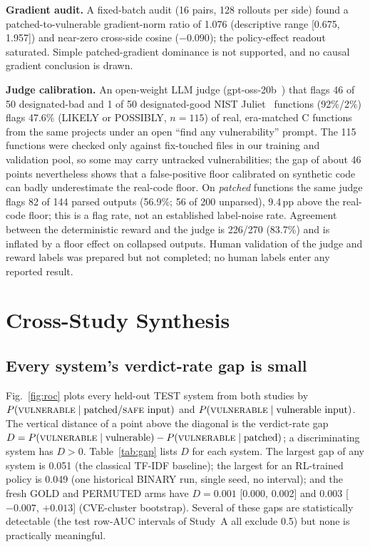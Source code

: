 \documentclass[journal]{IEEEtran}
\newcommand{\vuln}{\textsc{vulnerable}}
\newcommand{\safe}{\textsc{safe}}
\begin{document}
\textbf{Gradient audit.} A fixed-batch audit (16 pairs, 128 rollouts per side) found a patched-to-vulnerable gradient-norm ratio of 1.076 (descriptive range [0.675, 1.957]) and near-zero cross-side cosine ($-0.090$); the policy-effect readout saturated. Simple patched-gradient dominance is not supported, and no causal gradient conclusion is drawn.

\textbf{Judge calibration.} An open-weight LLM judge (gpt-oss-20b~\cite{gptoss}) that flags 46 of 50 designated-bad and 1 of 50 designated-good NIST Juliet~\cite{juliet} functions (92\%/2\%) flags 47.6\% (LIKELY or POSSIBLY, $n{=}115$) of real, era-matched C functions from the same projects under an open ``find any vulnerability'' prompt. The 115 functions were checked only against fix-touched files in our training and validation pool, so some may carry untracked vulnerabilities; the gap of about 46 points nevertheless shows that a false-positive floor calibrated on synthetic code can badly underestimate the real-code floor. On \emph{patched} functions the same judge flags 82 of 144 parsed outputs (56.9\%; 56 of 200 unparsed), 9.4\,pp above the real-code floor; this is a flag rate, not an established label-noise rate. Agreement between the deterministic reward and the judge is 226/270 (83.7\%) and is inflated by a floor effect on collapsed outputs. Human validation of the judge and reward labels was prepared but not completed; no human labels enter any reported result.

\section{Cross-Study Synthesis}
\label{sec:synthesis}
\subsection{Every system's verdict-rate gap is small}
Fig.~\ref{fig:roc} plots every held-out TEST system from both studies by $P(\vuln\mid\text{patched/\safe{} input})$ and $P(\vuln\mid\text{vulnerable input})$. The vertical distance of a point above the diagonal is the verdict-rate gap $D=P(\vuln\mid\text{vulnerable})-P(\vuln\mid\text{patched})$; a discriminating system has $D>0$. Table~\ref{tab:gap} lists $D$ for each system. The largest gap of any system is 0.051 (the classical TF-IDF baseline); the largest for an RL-trained policy is 0.049 (one historical BINARY run, single seed, no interval); and the fresh GOLD and PERMUTED arms have $D=0.001$ [0.000, 0.002] and $0.003$ [$-0.007$, $+0.013$] (CVE-cluster bootstrap). Several of these gaps are statistically detectable (the test row-AUC intervals of Study~A all exclude 0.5) but none is practically meaningful.
\end{document}
